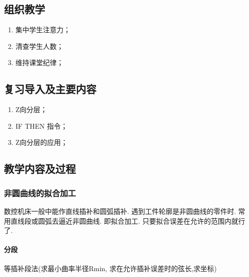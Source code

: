 \jxhj{%
	}
\skrq{%
	}

\makeshouye %

\subsection{组织教学}
\begin{enumerate}[\hspace{2em}1、]
	\item 集中学生注意力；
	\item 清查学生人数；
	\item 维持课堂纪律；
\end{enumerate}
\subsection{复习导入及主要内容}
\begin{enumerate}[\hspace{2em}1、]
\item Z向分层；
\item IF THEN 指令；
\item Z向分层的应用；
\end{enumerate}
\subsection{教学内容及过程}
\subsubsection{非圆曲线的拟合加工} %
 数控机床一般中能作直线插补和圆弧插补. 遇到工件轮廓是非圆曲线的零件时. 常用直线段或圆弧去逼近非圆曲线. 即拟合加工. 只要拟合误差在允许的范围内就行了.
 
 \paragraph{分段}
 等插补段法(求最小曲率半径Rmin, 求在允许插补误差时的弦长,求坐标)
 

